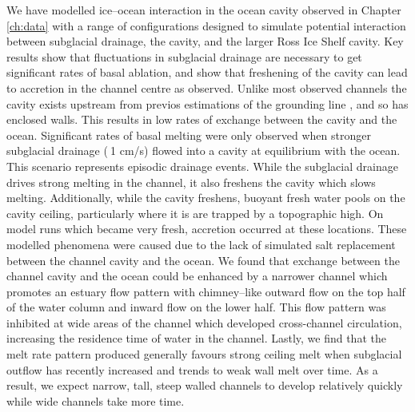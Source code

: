 We have modelled ice--ocean interaction in the ocean cavity observed in Chapter \ref{ch:data} with a range of configurations designed to simulate potential interaction between subglacial drainage, the cavity, and the larger Ross Ice Shelf cavity. Key results show that fluctuations in subglacial drainage are necessary to get significant rates of basal ablation, and show that freshening of the cavity can lead to accretion in the channel centre as observed. Unlike most observed channels the cavity exists upstream from previos estimations of the grounding line \cite{depoorter2013amii}, and so has enclosed walls. This results in low rates of exchange between the cavity and the ocean. Significant rates of basal melting were only observed when stronger subglacial drainage ($\>$1 cm/s) flowed into a cavity at equilibrium with the ocean. This scenario represents episodic drainage events. While the subglacial drainage drives strong melting in the channel, it also freshens the cavity which slows melting.  Additionally, while the cavity freshens, buoyant fresh water pools on the cavity ceiling, particularly where it is are trapped by a topographic high. On model runs which became very fresh, accretion occurred at these locations. These modelled phenomena were caused due to the lack of simulated salt replacement between the channel cavity and the ocean. We found that exchange between the channel cavity and the ocean could be enhanced by a narrower channel which promotes an estuary flow pattern with chimney--like outward flow on the top half of the water column and inward flow on the lower half. This flow pattern was inhibited at wide areas of the channel which developed cross-channel circulation, increasing the residence time of water in the channel. Lastly, we find that the melt rate pattern produced generally favours strong ceiling melt when subglacial outflow has recently increased and trends to weak wall melt over time. As a result, we expect narrow, tall, steep walled channels to develop relatively quickly while wide channels take more time.
